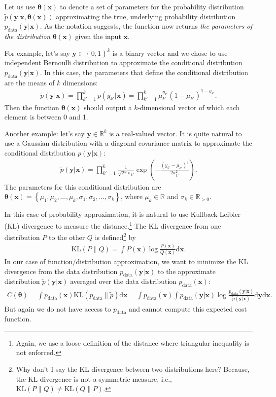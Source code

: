\documentclass{report}
\newcommand{\vect}[1]{\mathbf{#1}}
\newcommand{\vects}[1]{\boldsymbol{#1}}
\newcommand{\vx}[0]{\vect{x}}
\newcommand{\vy}[0]{\vect{y}}
\newcommand{\TT}[0]{\vects{\theta}}
\newcommand{\RR}[0]{\mathbb{R}}
\newcommand{\dd}[1]{\ensuremath{\mbox{d}#1}}
\newcommand{\KL}{\text{KL}}
\newcommand{\data}{\text{data}}
\begin{document}
Let us use $\TT(\vx)$ to denote a set of parameters for the probability
distribution $\tilde{p}(\vy|\vx, \TT(\vx))$ approximating the true, underlying
probability distribution $p_{\data}(\vy|\vx)$. As the notation suggests, the
function now returns {\em the parameters of the distribution} $\TT(\vx)$ given
the input $\vx$. 

For example, let's say $\vy \in \left\{ 0, 1\right\}^k$ is a binary vector and
we chose to use independent Bernoulli distribution to approximate the
conditional distribution $p_{\data}(\vy | \vx)$. In this case, the parameters
that define the conditional distribution are the means of $k$ dimensions:
\begin{align}
    \label{eq:bernoulli}
    \tilde{p}(\vy | \vx) = \prod_{k'=1}^k p(y_{k'}|\vx) = 
    \prod_{k'=1}^k \mu_{k'}^{y_{k'}} (1-\mu_{k'})^{1-y_{k'}}.
\end{align}
Then the function $\TT(\vx)$ should output a $k$-dimensional vector of which
each element is between 0 and 1.

Another example: let's say $\vy \in \RR^k$ is a real-valued vector. It is quite
natural to use a Gaussian distribution with a diagonal covariance matrix to
approximate the conditional distribution $p(\vy | \vx)$:
\begin{align}
    \label{eq:gaussian}
    \tilde{p}(\vy | \vx) = \prod_{k'=1}^k \frac{1}{\sqrt{2\pi}\sigma_{k'}} 
\exp\left( -\frac{(y_{k'} - \mu_{k'})^2}{2\sigma_{k'}^2} \right).
\end{align}
The parameters for this conditional distribution are $\TT(\vx) = \left\{ 
    \mu_1, \mu_2, \ldots, \mu_k, \sigma_1, \sigma_2, \ldots, \sigma_k
\right\}$, where $\mu_k \in \RR$ and $\sigma_k \in \RR_{>0}$.

In this case of probability approximation, it is natural to use
Kullback-Leibler (KL) divergence to measure the distance.\footnote{
    Again, we use a loose definition of the distance where triangular inequality
    is not enforced.
} 
The KL divergence from one distribution $P$ to the other $Q$ is
defined\footnote{
    Why don't I say the KL divergence between two distributions here? Because,
    the KL divergence is not a symmetric measure, i.e., $\KL(P\|Q) \neq
    \KL(Q\|P)$.
}
by
\begin{align*}
    \KL(P\|Q) = \int P(\vx) \log \frac{P(\vx)}{Q(\vx)} \dd{\vx}.
\end{align*}
In our case of function/distribution approximation, we want to minimize the KL
divergence from the data distribution $p_{\data}(\vy|\vx)$ to the approximate
distribution $\tilde{p}(\vy | \vx)$ averaged over the data distribution
$p_{\data}(\vx)$:
\begin{align*}
    C(\TT) = \int p_{\data}(\vx) \KL(p_{\data}\|\tilde{p}) \dd{\vx} = 
    \int p_{\data}(\vx) \int p_{\data}(\vy|\vx) \log \frac{p_{\data}
    (\vy|\vx)}{\tilde{p}(\vy|\vx)} \dd{\vy} \dd{\vx}.
\end{align*}
But again we do not have access to $p_{\data}$ and cannot compute this expected
cost function.
\end{document}
